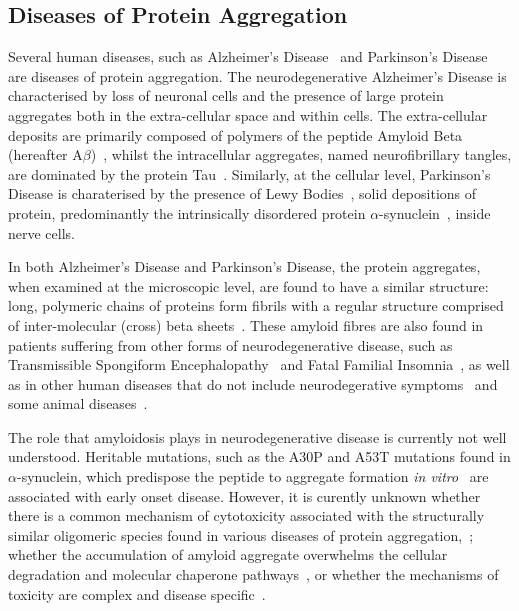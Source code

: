\subsection{Diseases of Protein Aggregation}
Several human diseases, such as Alzheimer's Disease~\cite{ueda1993} and Parkinson's Disease~\cite{spillantini1997} are diseases of protein aggregation. The neurodegenerative Alzheimer's Disease is characterised by loss of neuronal cells and the presence of large protein aggregates both in the extra-cellular space and within cells. The extra-cellular deposits are primarily composed of polymers of the peptide Amyloid Beta (hereafter A${\beta}$)~\cite{Noe2004}, whilst the intracellular aggregates, named neurofibrillary tangles, are dominated by the protein Tau~\cite{goedert1989}. Similarly, at the cellular level, Parkinson's Disease is charaterised by the presence of Lewy Bodies~\cite{Gibb1988}, solid depositions of protein, predominantly the intrinsically disordered protein $\alpha$-synuclein~\cite{spillantini1997}, inside nerve cells.


In both Alzheimer's Disease and Parkinson's Disease, the protein aggregates, when examined at the microscopic level, are found to have a similar structure: long, polymeric chains of proteins form fibrils with a regular structure comprised of inter-molecular (cross) beta sheets~\cite{Serpell2000}. These amyloid fibres are also found in patients suffering from other forms of neurodegenerative disease, such as Transmissible Spongiform Encephalopathy~\cite{Wells1987} and Fatal Familial Insomnia~\cite{Goldfarb1992}, as well as in other human diseases that do not include neurodegerative symptoms~\cite{Clark1988} and some animal diseases~\cite{Safar1993}. 


The role that amyloidosis plays in neurodegenerative disease is currently not well understood. Heritable mutations, such as the A30P and A53T mutations found in $\alpha$-synuclein, which predispose the peptide to aggregate formation \emph{in vitro}~\cite{Conway1999} are associated with early onset disease. However, it is curently unknown whether there is a common mechanism of cytotoxicity associated with the structurally similar oligomeric species found in various diseases of protein aggregation,~\cite{Haas2007}; whether the accumulation of amyloid aggregate overwhelms the cellular degradation and molecular chaperone pathways~\cite{Muchowski2005}, or whether the mechanisms of toxicity are complex and disease specific~\cite{Benilova2012}.      

